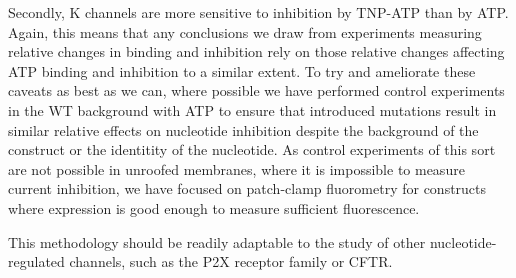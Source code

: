 Secondly, K\ATP{} channels are more sensitive to inhibition by TNP-ATP than by ATP.
Again, this means that any conclusions we draw from experiments measuring relative changes in binding and inhibition rely on those relative changes affecting ATP binding and inhibition to a similar extent.
To try and ameliorate these caveats as best as we can, where possible we have performed control experiments in the WT background with ATP to ensure that introduced mutations result in similar relative effects on nucleotide inhibition despite the background of the construct or the identitity of the nucleotide.
As control experiments of this sort are not possible in unroofed membranes, where it is impossible to measure current inhibition, we have focused on patch-clamp fluorometry for constructs where expression is good enough to measure sufficient fluorescence.

This methodology should be readily adaptable to the study of other nucleotide-regulated channels, such as the P2X receptor family or CFTR.
